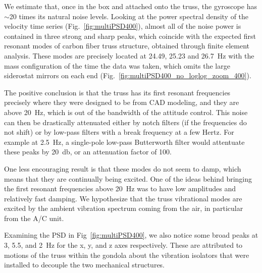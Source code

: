 We estimate that, once in the box and attached onto the truss, the gyroscope has $\sim$20 times its natural noise levels. Looking at the power spectral density of the velocity time series (Fig.~\ref{fig:multiPSD400}), almost all of the noise power is contained in three strong and sharp peaks, which coincide with the expected first resonant modes of carbon fiber truss structure, obtained through finite element analysis. These modes are precisely located at 24.49, 25.23 and \SI{26.7}{\hertz} with the mass configuration of the time the data was taken, which omits the large siderostat mirrors on each end (Fig.~\ref{fig:multiPSD400_no_loglog_zoom_400}).

The positive conclusion is that the truss has its first resonant frequencies precisely where they were designed to be from CAD modeling, and they are above \SI{20}{\hertz}, which is out of the bandwidth of the attitude control. This noise can then be drastically attenuated either by notch filters (if the frequencies do not shift) or by low-pass filters with a break frequency at a few Hertz. For example at \SI{2.5}{\hertz}, a single-pole low-pass Butterworth filter would attentuate these peaks by \SI{20}{\decibel}, or an attenuation factor of 100. 

One less encouraging result is that these modes do not seem to damp, which means that they are continually being excited. One of the ideas behind bringing the first resonant frequencies above \SI{20}{\hertz} was to have low amplitudes and relatively fast damping. We hypothesize that the truss vibrational modes are excited by the ambient vibration spectrum coming from the air, in particular from the A/C unit.

Examining the PSD in Fig~\ref{fig:multiPSD400}, we also notice some broad peaks at 3, 5.5, and \SI{2}{\hertz} for the x, y, and z axes respectively. These are attributed to motions of the truss within the gondola about the vibration isolators that were installed to decouple the two mechanical structures. 




